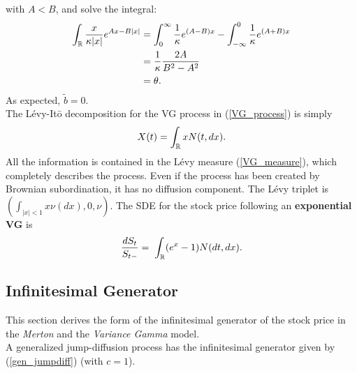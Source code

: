 with $A<B$, and solve the integral:
\begin{align*}
 \int_{\mathbb{R}} \frac{x}{\kappa |x|} e^{Ax-B|x|} &= \int_{0}^{\infty} \frac{1}{\kappa} e^{(A-B)x} 
 - \int_{-\infty}^0 \frac{1}{\kappa} e^{(A+B)x} \\
 &= \frac{1}{\kappa} \frac{2A}{B^2-A^2} \\
 &= \theta.
\end{align*}
As expected, $\tilde b = 0$. \\
The Lévy-It\={o} decomposition for the VG process in (\ref{VG_process}) is simply
\begin{equation}
X(t) = \int_{\mathbb{R}} x N(t,dx). 
\end{equation}
All the information is contained in the Lévy measure (\ref{VG_measure}),
which completely describes the process. Even if the process has been created by Brownian
subordination, it has no diffusion component.  
The L\'evy triplet is $( \int_{|x|<1} x \nu(dx), 0, \nu)$.
The SDE for the stock price following an \textbf{exponential VG} is 
\begin{equation}\label{VG_sde}
 \frac{d S_t}{S_{t-}}  = \; \int_{\mathbb{R}} (e^{x} - 1) N(dt,dx).  
\end{equation}


\subsection{Infinitesimal Generator}

This section derives the form of the infinitesimal generator of the stock price in the \emph{Merton} and the \emph{Variance Gamma} model.\\
A generalized jump-diffusion process has the infinitesimal generator given by (\ref{gen_jumpdiff}) (with $c=1$). 

